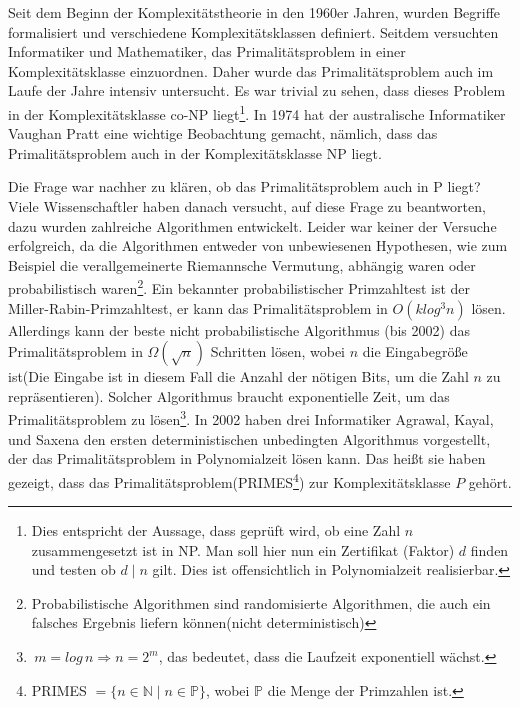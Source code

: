 \documentclass[12pt,oneside]{article}
\theoremstyle{remark}
\theoremstyle{definition}
\begin{document}
Seit dem Beginn der Komplexitätstheorie in den 1960er Jahren, wurden Begriffe formalisiert und verschiedene Komplexitätsklassen definiert\cite{com-theory}. Seitdem versuchten Informatiker und Mathematiker, das Primalitätsproblem in einer Komplexitätsklasse einzuordnen. Daher wurde das Primalitätsproblem auch im Laufe der Jahre intensiv untersucht. Es war trivial zu sehen, dass dieses Problem in der Komplexitätsklasse co-NP liegt\footnote{Dies entspricht der Aussage, dass geprüft wird, ob eine Zahl $n$ zusammengesetzt ist in NP. Man soll hier nun ein Zertifikat (Faktor) $d$ finden und testen ob $d \mid n$ gilt. Dies ist offensichtlich in Polynomialzeit realisierbar.\newline}. In 1974 hat der australische Informatiker Vaughan Pratt eine wichtige Beobachtung gemacht, nämlich, dass das Primalitätsproblem auch in der Komplexitätsklasse NP liegt\cite{pratt}.

Die Frage war nachher zu klären, ob das Primalitätsproblem auch in P liegt? Viele Wissenschaftler haben danach versucht, auf diese Frage zu beantworten, dazu wurden zahlreiche Algorithmen entwickelt. Leider war keiner der Versuche erfolgreich, da die Algorithmen entweder von unbewiesenen Hypothesen, wie zum Beispiel die verallgemeinerte Riemannsche Vermutung, abhängig waren oder probabilistisch waren\footnote{Probabilistische Algorithmen sind randomisierte Algorithmen, die auch ein falsches Ergebnis liefern können(nicht deterministisch)}. Ein bekannter probabilistischer Primzahltest ist der Miller-Rabin-Primzahltest, er kann das Primalitätsproblem in $O(k log^3 n)$ lösen\cite{milRab}. Allerdings kann der beste nicht probabilistische Algorithmus (bis 2002) das Primalitätsproblem in $ \Omega(\sqrt{n}) $ Schritten lösen, wobei $n$ die Eingabegröße ist(Die Eingabe ist in diesem Fall die Anzahl der nötigen Bits, um die Zahl $n$ zu repräsentieren). Solcher Algorithmus braucht exponentielle Zeit, um das Primalitätsproblem zu lösen\footnote{$\, m = log \, n \Rightarrow n = 2^m$, das bedeutet, dass die Laufzeit exponentiell wächst.}. In 2002 haben drei Informatiker Agrawal, Kayal, und Saxena den ersten deterministischen unbedingten Algorithmus vorgestellt, der das Primalitätsproblem in Polynomialzeit lösen kann. Das heißt sie haben gezeigt, dass das Primalitätsproblem(PRIMES\footnote{PRIMES $= \{ n \in \mathbb{N} \mid n \in \mathbb{P} \}$, wobei $\mathbb{P}$ die Menge der Primzahlen ist.}) zur Komplexitätsklasse $P$ gehört.      
\end{document}
